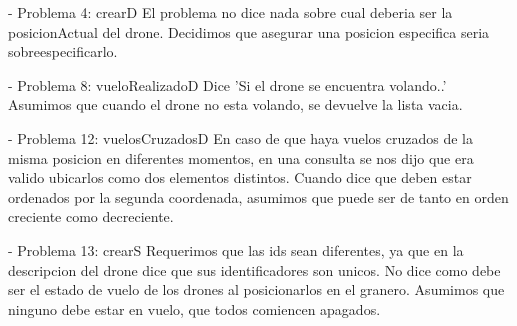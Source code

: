 - Problema 4: crearD\newline
El problema no dice nada sobre cual deberia ser la posicionActual del drone. Decidimos que asegurar una posicion especifica seria sobreespecificarlo.\newline
\vspace{5mm}

- Problema 8: vueloRealizadoD\newline
Dice 'Si el drone se encuentra volando..' Asumimos que cuando el drone no esta volando, se devuelve la lista vacia. \newline
\vspace{5mm}

- Problema 12: vuelosCruzadosD\newline
En caso de que haya vuelos cruzados de la misma posicion en diferentes momentos, en una consulta se nos dijo que era valido ubicarlos como dos elementos distintos. \newline
Cuando dice que deben estar ordenados por la segunda coordenada, asumimos que puede ser de tanto en orden creciente como decreciente.\newline
\vspace{5mm}

- Problema 13: crearS\newline
Requerimos que las ids sean diferentes, ya que en la descripcion del drone dice que sus identificadores son unicos.\newline
No dice como debe ser el estado de vuelo de los drones al posicionarlos en el granero. Asumimos que ninguno debe estar en vuelo, que todos comiencen apagados. \newline
\vspace{5mm}



